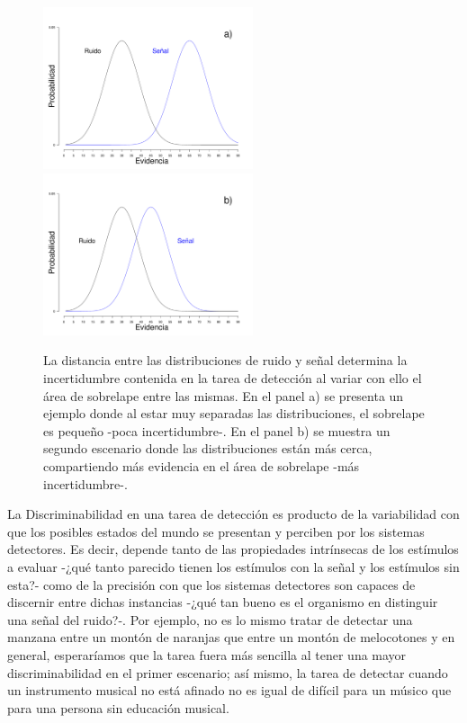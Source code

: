 \begin{figure}[th]
\centering
\includegraphics[width=0.55\textwidth]{Figures/Overlap_Small}\\ 
\includegraphics[width=0.55\textwidth]{Figures/Overlap_Big} 
\caption[El sobrelape Ruido-señal como reflejo de la incertidumbre contenida en tareas de detección]{La distancia entre las distribuciones de ruido y señal determina la incertidumbre contenida en la tarea de detección al variar con ello el área de sobrelape entre las mismas. En el panel a) se presenta un ejemplo donde al estar muy separadas las distribuciones, el sobrelape es pequeño -poca incertidumbre-. En el panel b) se muestra un segundo escenario donde las distribuciones están más cerca, compartiendo más evidencia en el área de sobrelape -más incertidumbre-.}
\label{fig:Overlap}
\end{figure}

La Discriminabilidad en una tarea de detección es producto de la variabilidad con que los posibles estados del mundo se presentan y perciben por los sistemas detectores. Es decir, depende tanto de las propiedades intrínsecas de los estímulos a evaluar -¿qué tanto parecido tienen los estímulos con la señal y los estímulos sin esta?- como de la precisión con que los sistemas detectores son capaces de discernir entre dichas instancias -¿qué tan bueno es el organismo en distinguir una señal del ruido?-. Por ejemplo, no es lo mismo tratar de detectar una manzana entre un montón de naranjas que entre un montón de melocotones y en general, esperaríamos que la tarea fuera más sencilla al tener una mayor discriminabilidad en el primer escenario; así mismo, la tarea de detectar cuando un instrumento musical no está afinado no es igual de difícil para un músico que para una persona sin educación musical.\\

